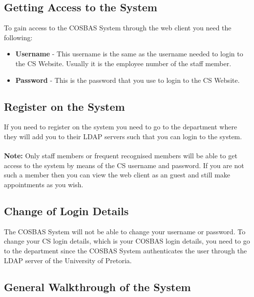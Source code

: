 \subsection{Getting Access to the System}
To gain access to the COSBAS System through the web client you need the following:
	\begin{itemize}
		\item{\textbf{Username} - This username is the same as the username needed to login to the CS Website. 
					   Usually it is the employee number of the staff member.} 
		\item{\textbf{Password} - This is the password that you use to login to the CS Website.}
	\end{itemize}

\subsection{Register on the System}
If you need to register on the system you need to go to the department where they will add you to their LDAP servers such that you can login to the system. \\
\\
\textbf{Note:} Only staff members or frequent recognised members will be able to get access to the system by means of the CS username and password. If you are not such a member then you can view the web client as an guest and still make appointments as you wish.

\subsection{Change of Login Details}
The COSBAS System will not be able to change your username or password. To change your CS login details, which is your COSBAS login details, you need to go to the department since the COSBAS System authenticates the user through the LDAP server of the University of Pretoria.

\subsection{General Walkthrough of the System}
